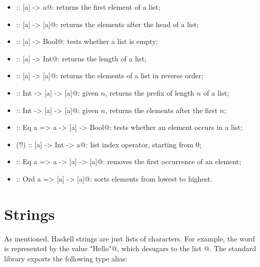 \documentclass[UdineBachThesis,american,11pt]{PhdThesis}
\begin{document}
  \begin{itemize}
    \item \lstinline@head :: [a] -> a@: returns the first element of a list;

    \item \lstinline@tail :: [a] -> [a]@: returns the elements after the head of
    a list;

    \item \lstinline@null :: [a] -> Bool@: tests whether a list is empty;

    \item \lstinline@length :: [a] -> Int@: returns the length of a list;

    \item \lstinline@reverse :: [a] -> [a]@: returns the elements of a list in
    reverse order;

    \item \lstinline@take :: Int -> [a] -> [a]@: given $n$, returns the prefix
    of length $n$ of a list;

    \item \lstinline@drop :: Int -> [a] -> [a]@: given $n$, returns the elements
    after the first $n$;

    \item \lstinline@elem :: Eq a => a -> [a] -> Bool@: tests whether an element
    occurs in a list;

    \item \lstinline@(!!) :: [a] -> Int -> a@: list index operator, starting
    from $0$;

    \item \lstinline@delete :: Eq a => a -> [a] -> [a]@: removes the first
    occurrence of an element;

    \item \lstinline@sort :: Ord a => [a] -> [a]@: sorts elements from lowest to
    highest.
  \end{itemize}

  \newpage

  \section{Strings}

  As mentioned, Haskell strings are just lists of characters. For example, the
  word \lstinline@Hello@ is represented by the value \lstinline@"Hello"@, which
  desugars to the list \lstinline@['H', 'e', 'l', 'l', 'o']@. The standard
  library exports the following type alias:
\end{document}
